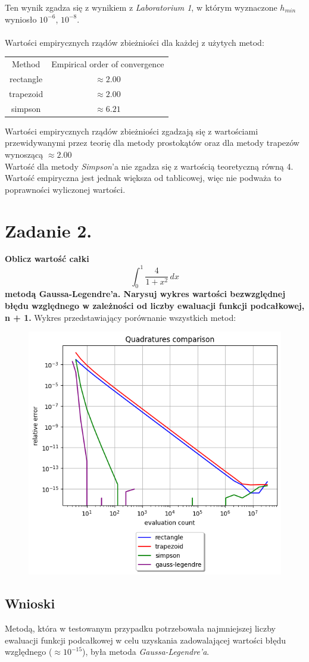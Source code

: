 \documentclass{article}
\begin{document}
Ten wynik zgadza się z wynikiem z \textit{Laboratorium 1}, w którym
wyznaczone $h_{min}$ wyniosło $10^{-6}$, $10^{-8}$. \\\\
\null\quad
Wartości empirycznych rządów zbieżniości dla każdej z
użytych metod:
\begin{center}
  \begin{tabular}{c c} 
   Method & Empirical order of convergence\\
   rectangle & $\approx 2.00$\\
   trapezoid & $\approx 2.00$\\
   simpson & $\approx 6.21$
  \end{tabular}
\end{center}
\null\quad
Wartości empirycznych rządów zbieżniości zgadzają się z
wartościami przewidywanymi przez teorię dla metody prostokątów oraz
dla metody trapezów wynoszącą $\approx 2.00$\\
Wartość dla metody \textit{Simpson}'a nie zgadza się z
wartością teoretyczną równą 4.\\
Wartość empiryczna jest jednak większa od tablicowej,
więc nie podważa to poprawności wyliczonej wartości.

\section*{Zadanie 2.}
\textbf{Oblicz wartość całki $$ \int_{0}^{1} \frac{4}{1+x^2} \,dx $$
metodą Gaussa-Legendre’a. Narysuj wykres wartości bezwzględnej
błędu względnego w zależności od liczby ewaluacji funkcji
podcałkowej, n + 1.}
\newpage
Wykres przedstawiający porównanie wszystkich metod:
\begin{figure}[H]
  \includegraphics[width=\linewidth]{figures/GL.png}
\end{figure}


\subsection*{Wnioski}
\null\quad Metodą, która w testowanym przypadku potrzebowała
najmniejszej liczby ewaluacji funkcji podcałkowej w celu uzyskania
zadowalającej wartości błędu względnego ($\approx 10^{-15}$), była
metoda \textit{Gaussa-Legendre'a}.
\end{document}
